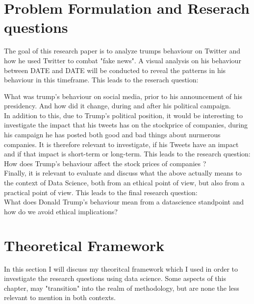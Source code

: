 \documentclass{article}
\begin{document}
\section{Problem Formulation and Reserach questions} \label{sec:ch1}
The goal of this research paper is to analyze  trumps behaviour on Twitter and how he used Twitter to combat "fake news". A visual analysis on his behaviour between DATE and DATE will be conducted to reveal the patterns in his behaviour in this timeframe. This leads to the reserach question: 

\par\vspace{10pt}

What was trump's behaviour on social media, prior to his announcement of his presidency. And how did it change, during and after his political campaign.\\

In addition to this, due to Trump's political position, it would be interesting to investigate the impact that his tweets has on the stockprice of companies, during his campaign he has posted both good and bad things about nurmerous companies. It is therefore relevant to investigate, if his Tweets have an impact and if that impact is short-term or long-term. This leads to the research question:\\

How does Trump's behaviour affect the stock prices of companies ? \\

Finally, it is relevant to evaluate and discuss what the above actually means to the context of Data Science, both from an ethical point of view, but also from a practical point of view. This leads to the final research question: \\

What does Donald Trump's behaviour mean from a datascience standpoint and how do we avoid ethical implications?
 



\section{Theoretical Framework}
In this section I will discuss my theoritcal framework which I used in order to investigate the research questions using data science. Some aspects of this chapter, may "transition" into the realm of methodology, but are none the less relevant to mention in both contexts.
\end{document}
